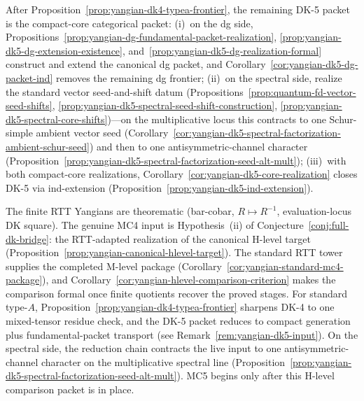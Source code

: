 \begin{remark}
\label{rem:yangian-dk5-input}
After Proposition~\ref{prop:yangian-dk4-typea-frontier}, the remaining
DK-5 packet is the compact-core categorical packet:
\textup{(i)}~on the dg side,
Propositions~\ref{prop:yangian-dg-fundamental-packet-realization},
\ref{prop:yangian-dk5-dg-extension-existence},
and~\ref{prop:yangian-dk5-dg-realization-formal} construct and extend
the canonical dg packet, and
Corollary~\ref{cor:yangian-dk5-dg-packet-ind} removes the remaining
dg frontier;
\textup{(ii)}~on the spectral side, realize the standard vector
seed-and-shift datum
(Propositions~\ref{prop:quantum-fd-vector-seed-shifts},
\ref{prop:yangian-dk5-spectral-seed-shift-construction},
\ref{prop:yangian-dk5-spectral-core-shifts})---on the multiplicative
locus this contracts to one Schur-simple ambient vector seed
(Corollary~\ref{cor:yangian-dk5-spectral-factorization-ambient-schur-seed})
and then to one antisymmetric-channel character
(Proposition~\ref{prop:yangian-dk5-spectral-factorization-seed-alt-mult});
\textup{(iii)}~with both compact-core realizations,
Corollary~\ref{cor:yangian-dk5-core-realization} closes DK-5 via
ind-extension (Proposition~\ref{prop:yangian-dk5-ind-extension}).
\end{remark}

\begin{remark}
\label{rem:yangian-mc4-boundary}
The finite RTT Yangians are theorematic (bar-cobar, $R\mapsto R^{-1}$,
evaluation-locus DK square).  The genuine MC4 input is
Hypothesis~\textup{(ii)} of Conjecture~\ref{conj:full-dk-bridge}: the
RTT-adapted realization of the canonical H-level target
(Proposition~\ref{prop:yangian-canonical-hlevel-target}).
The standard RTT tower supplies the completed M-level package
(Corollary~\ref{cor:yangian-standard-mc4-package}), and
Corollary~\ref{cor:yangian-hlevel-comparison-criterion} makes the
comparison formal once finite quotients recover the proved stages.
For standard type-$A$,
Proposition~\ref{prop:yangian-dk4-typea-frontier} sharpens DK-4 to
one mixed-tensor residue check, and the DK-5 packet reduces to compact
generation plus fundamental-packet transport (see
Remark~\ref{rem:yangian-dk5-input}).  On the spectral side, the
reduction chain contracts the live input to one antisymmetric-channel
character on the multiplicative spectral line
(Proposition~\ref{prop:yangian-dk5-spectral-factorization-seed-alt-mult}).
MC5 begins only after this H-level comparison packet is in place.
\end{remark}

